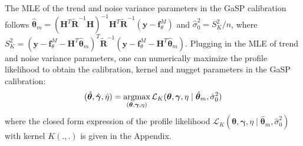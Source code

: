 The MLE of the trend and noise variance parameters in the GaSP calibration follows $\hat {\bm \theta}_m= \left( \mathbf H^T {{\mathbf { \tilde R}}}^{-1}  \mathbf H \right)^{-1} \mathbf H^T {{\mathbf { \tilde R}}}^{-1}{(\mathbf{y}-\mathbf f^M_{\theta})}$ and $ \hat{\sigma}^2_0 =S^2_{K}/n$, where $S^2_K=  (\mathbf{y}-\mathbf f^M_{\theta}- \mathbf H^T \hat{\bm \theta}_m  )^T  {{\mathbf { \tilde R}}}^{-1}(\mathbf{y}-\mathbf f^M_{\theta}- \mathbf H^T \hat{\bm \theta}_m  )$.  Plugging in the MLE of  trend and noise variance parameters, one can numerically maximize the profile likelihood to obtain the calibration, kernel and nugget parameters in the GaSP calibration: 
\begin{equation}
(\hat {\bm \theta}, \hat {\bm \gamma}, \hat \eta ) =\argmax_{(\bm \theta, \bm \gamma, \eta)} \mathcal L_K( \bm \theta, \bm \gamma, \eta \mid \hat {\bm \theta}_m, \hat \sigma^2_0 )  
\label{equ:MLE_GaSP} 
\end{equation}
where the closed form expression of the profile likelihood $\mathcal L_K( \bm \theta, \bm \gamma, \eta \mid { \hat {\bm \theta}_m}, \hat \sigma^2_0 )  $ with kernel $K(.,.)$  is  given in the Appendix.

